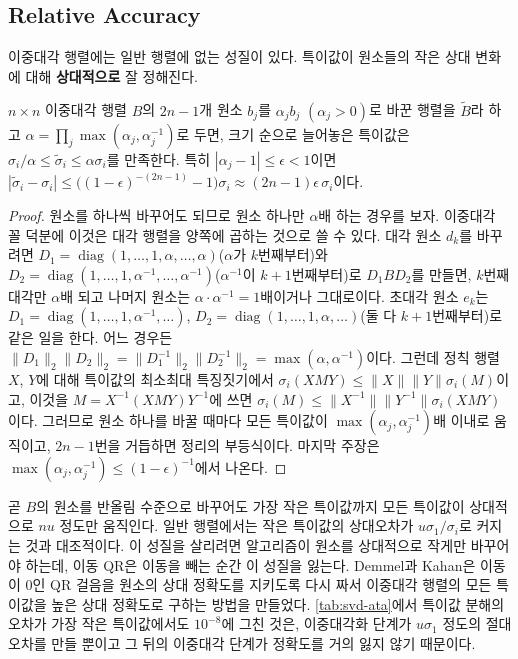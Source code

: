 \subsection{Relative Accuracy}

이중대각 행렬에는 일반 행렬에 없는 성질이 있다. 특이값이 원소들의 작은 상대 변화에 대해 \textbf{상대적으로} 잘 정해진다.

\begin{theorem}
\label{thm:bidiag-relative}
$n\times n$ 이중대각 행렬 $B$의 $2n-1$개 원소 $b_j$를 $\alpha_jb_j$ $(\alpha_j>0)$로 바꾼 행렬을 $\tilde B$라 하고 $\alpha=\prod_j\max(\alpha_j,\alpha_j^{-1})$로 두면, 크기 순으로 늘어놓은 특이값은 $\sigma_i/\alpha\le\tilde\sigma_i\le\alpha\sigma_i$를 만족한다. 특히 $|\alpha_j-1|\le\epsilon<1$이면 $|\tilde\sigma_i-\sigma_i|\le\bigl((1-\epsilon)^{-(2n-1)}-1\bigr)\sigma_i\approx(2n-1)\epsilon\,\sigma_i$이다.
\end{theorem}

\begin{proof}
원소를 하나씩 바꾸어도 되므로 원소 하나만 $\alpha$배 하는 경우를 보자. 이중대각 꼴 덕분에 이것은 대각 행렬을 양쪽에 곱하는 것으로 쓸 수 있다. 대각 원소 $d_k$를 바꾸려면 $D_1=\operatorname{diag}(1,\dots,1,\alpha,\dots,\alpha)$($\alpha$가 $k$번째부터)와 $D_2=\operatorname{diag}(1,\dots,1,\alpha^{-1},\dots,\alpha^{-1})$($\alpha^{-1}$이 $k+1$번째부터)로 $D_1BD_2$를 만들면, $k$번째 대각만 $\alpha$배 되고 나머지 원소는 $\alpha\cdot\alpha^{-1}=1$배이거나 그대로이다. 초대각 원소 $e_k$는 $D_1=\operatorname{diag}(1,\dots,1,\alpha^{-1},\dots)$, $D_2=\operatorname{diag}(1,\dots,1,\alpha,\dots)$(둘 다 $k+1$번째부터)로 같은 일을 한다. 어느 경우든 $\|D_1\|_2\|D_2\|_2=\|D_1^{-1}\|_2\|D_2^{-1}\|_2=\max(\alpha,\alpha^{-1})$이다. 그런데 정칙 행렬 $X$, $Y$에 대해 특이값의 최소최대 특징짓기에서 $\sigma_i(XMY)\le\|X\|\|Y\|\sigma_i(M)$이고, 이것을 $M=X^{-1}(XMY)Y^{-1}$에 쓰면 $\sigma_i(M)\le\|X^{-1}\|\|Y^{-1}\|\sigma_i(XMY)$이다. 그러므로 원소 하나를 바꿀 때마다 모든 특이값이 $\max(\alpha_j,\alpha_j^{-1})$배 이내로 움직이고, $2n-1$번을 거듭하면 정리의 부등식이다. 마지막 주장은 $\max(\alpha_j,\alpha_j^{-1})\le(1-\epsilon)^{-1}$에서 나온다.
\end{proof}

곧 $B$의 원소를 반올림 수준으로 바꾸어도 가장 작은 특이값까지 모든 특이값이 상대적으로 $nu$ 정도만 움직인다. 일반 행렬에서는 작은 특이값의 상대오차가 $u\sigma_1/\sigma_i$로 커지는 것과 대조적이다. 이 성질을 살리려면 알고리즘이 원소를 상대적으로 작게만 바꾸어야 하는데, 이동 QR은 이동을 빼는 순간 이 성질을 잃는다. Demmel과 Kahan은 이동이 $0$인 QR 걸음을 원소의 상대 정확도를 지키도록 다시 짜서 이중대각 행렬의 모든 특이값을 높은 상대 정확도로 구하는 방법을 만들었다\cite{demmel1990kahan}. \cref{tab:svd-ata}에서 특이값 분해의 오차가 가장 작은 특이값에서도 $10^{-8}$에 그친 것은, 이중대각화 단계가 $u\sigma_1$ 정도의 절대오차를 만들 뿐이고 그 뒤의 이중대각 단계가 정확도를 거의 잃지 않기 때문이다.

